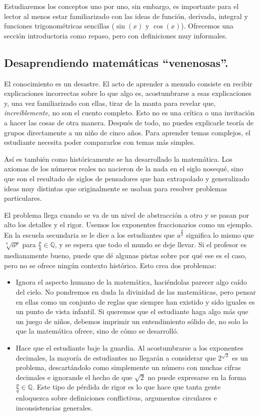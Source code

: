 Estudiaremos los conceptos uno por uno, sin embargo, es importante para el lector al menos estar familiarizado con las ideas de función, derivada, integral y funciones trigonométricas sencillas ($\sin(x)$ y $\cos(x)$). Ofrecemos una sección introductoria como repaso, pero con definiciones muy informales.

\subsection{Desaprendiendo matemáticas \enquote{venenosas}.}

El conocimiento es un desastre. El acto de aprender a menudo consiste en recibir explicaciones incorrectas sobre lo que algo es, acostumbrarse a esas explicaciones y, una vez familiarizado con ellas, tirar de la manta para revelar que, \textit{increíblemente}, no son el cuento completo. Esto no es una crítica o una invitación a hacer las cosas de otra manera. Después de todo, no puedes explicarle teoría de grupos directamente a un niño de cinco años. Para aprender temas complejos, el estudiante necesita poder compararlos con temas más simples.

Así es también como históricamente se ha desarrollado la matemática. Los axiomas de los números reales no nacieron de la nada en el siglo nosequé, sino que son el resultado de siglos de pensadores que han extrapolado y generalizado ideas muy distintas que originalmente se usaban para resolver problemas particulares.

El problema llega cuando se va de un nivel de abstracción a otro y se pasan por alto los detalles y el rigor. Usemos los exponentes fraccionarios como un ejemplo. En la escuela secundaria se le dice a los estudiantes que $a^{\frac{p}{q}}$ significa lo mismo que $\sqrt[q]{a^p}$ para $\frac{p}{q} \in \mathbb{Q}$, y se espera que todo el mundo se deje llevar. Si el profesor es medianamente bueno, puede que dé algunas pistas sobre por qué ese es el caso, pero no se ofrece ningún contexto histórico. Esto crea dos problemas:

\begin{itemize}
	\item Ignora el aspecto humano de la matemática, haciéndolas parecer algo caído del cielo. No pondremos en duda la divinidad de las matemáticas, pero pensar en ellas como un conjunto de reglas que siempre han existido y sido iguales es un punto de vista infantil. Si queremos que el estudiante haga algo más que un juego de niños, debemos imprimir un entendimiento sólido de, no solo lo que la matemática ofrece, sino de cómo se desarrolló.
	\item Hace que el estudiante baje la guardia. Al acostumbrarse a los exponentes decimales, la mayoría de estudiantes no llegarán a considerar que $2^{\sqrt{2}}$ es un problema, descartándolo como simplemente un número con muchas cifras decimales e ignorande el hecho de que $\sqrt{2}$ no puede expresarse en la forma $\frac{p}{q} \in \mathbb{Q}$. Este tipo de pérdida de rigor es lo que hace que tanta gente enloquezca sobre definiciones conflictivas, argumentos circulares e inconsistencias generales.
\end{itemize}

